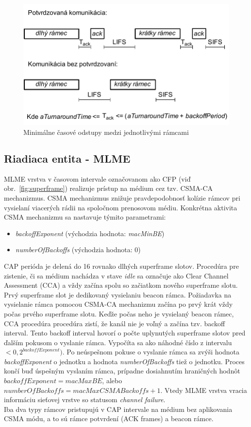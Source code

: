 \begin{figure}[htbp]
\begin{center}
\includegraphics[width=120mm]{figures/interframe_spacing}
\caption{Minimálne časové odstupy medzi jednotlivými rámcami}
\label{fig:interframe_spacing}
\end{center}
\end{figure}
\subsection{Riadiaca entita - MLME}
\indent\indent MLME vrstva v časovom intervale označovanom ako CFP (viď obr.~\ref{fig:superframe}) realizuje prístup na médium cez tzv. CSMA-CA mechanizmus. CSMA mechanizmus znižuje pravdepodobnosť kolízie rámcov pri vysielaní viacerých rádii na spoločnom prenosovom médiu. Konkrétna aktivita CSMA mechanizmu sa nastavuje týmito parametrami:
\begin{itemize}
\item \textit{backoffExponent} (východzia hodnota: \textit{macMinBE})
\item \textit{numberOfBackoffs} (východzia hodnota: $0$)
\end{itemize}
\indent\indent CAP perióda je delená do 16 rovnako dlhých superframe slotov. Procedúra pre zistenie, či sa médium nachádza v stave \textit{idle} sa označuje ako Clear Channel Assessment (CCA) a vždy začína spolu so začiatkom nového superframe slotu. Prvý superframe slot je dedikovaný vysielaniu beacon rámca. Požiadavka na vysielanie rámca pomocou CSMA-CA mechanizmu začína po prvý krát vždy počas prvého superframe slotu. Keďže počas neho je vysielaný beacon rámec, CCA procedúra procedúra zistí, že kanál nie je voľný a začína tzv. backoff interval. Tento backoff interval hovorí o počte uplynutých superframe slotov pred ďalším pokusom o vyslanie rámca. Vypočíta sa ako náhodné číslo z intervalu $<0, 2^{backoffExponent})$. Po neúspešnom pokuse o vyslanie rámca sa zvýši hodnota \textit{backoffExponent} o jednotku a hodnota \textit{numberOfBackoffs} tiež o jednotku. Proces končí buď úspešným vyslaním rámca, prípadne dosiahnutím hraničných hodnôt $backoffExponent=macMaxBE$, alebo $numberOfBackoffs=macMaxCSMABackoffs+1$. Vtedy MLME vrstva vracia informáciu sieťovej vrstve so statusom \textit{channel failure}.\\
\indent Iba dva typy rámcov pristupujú v CAP intervale na médium bez aplikovania CSMA módu, a to sú rámce potvrdení (ACK frames) a beacon rámce.\\
